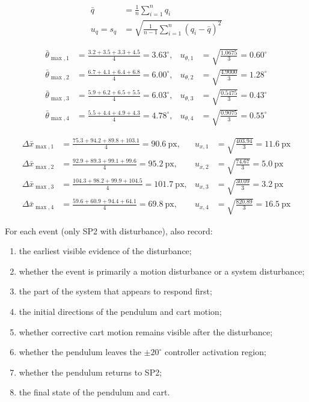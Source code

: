 \documentclass[11pt,a4paper]{article}
\begin{document}
\begin{align}
\bar{q} &= \frac{1}{n}\sum_{i=1}^{n} q_i \label{eq:mean} \\
u_q = s_q &= \sqrt{\frac{1}{n-1}\sum_{i=1}^{n}\left(q_i-\bar{q}\right)^2} \label{eq:std}
\end{align}

\begin{align*}
\bar{\theta}_{\max,1} &= \frac{3.2+3.5+3.3+4.5}{4} = 3.63^\circ, &
u_{\theta,1} &= \sqrt{\frac{1.0675}{3}} = 0.60^\circ \\
\bar{\theta}_{\max,2} &= \frac{6.7+4.1+6.4+6.8}{4} = 6.00^\circ, &
u_{\theta,2} &= \sqrt{\frac{4.9000}{3}} = 1.28^\circ \\
\bar{\theta}_{\max,3} &= \frac{5.9+6.2+6.5+5.5}{4} = 6.03^\circ, &
u_{\theta,3} &= \sqrt{\frac{0.5475}{3}} = 0.43^\circ \\
\bar{\theta}_{\max,4} &= \frac{5.5+4.4+4.9+4.3}{4} = 4.78^\circ, &
u_{\theta,4} &= \sqrt{\frac{0.9075}{3}} = 0.55^\circ
\end{align*}

\begin{align*}
\Delta\bar{x}_{\max,1} &= \frac{75.3+94.2+89.8+103.1}{4} = 90.6~\text{px}, &
u_{x,1} &= \sqrt{\frac{403.94}{3}} = 11.6~\text{px} \\
\Delta\bar{x}_{\max,2} &= \frac{92.9+89.3+99.1+99.6}{4} = 95.2~\text{px}, &
u_{x,2} &= \sqrt{\frac{74.67}{3}} = 5.0~\text{px} \\
\Delta\bar{x}_{\max,3} &= \frac{104.3+98.2+99.9+104.5}{4} = 101.7~\text{px}, &
u_{x,3} &= \sqrt{\frac{30.09}{3}} = 3.2~\text{px} \\
\Delta\bar{x}_{\max,4} &= \frac{59.6+60.9+94.4+64.1}{4} = 69.8~\text{px}, &
u_{x,4} &= \sqrt{\frac{820.89}{3}} = 16.5~\text{px}
\end{align*}

For each event (only SP2 with disturbance), also record:
\begin{enumerate}
    \item the earliest visible evidence of the disturbance;
    \item whether the event is primarily a motion disturbance or a system disturbance;
    \item the part of the system that appears to respond first;
    \item the initial directions of the pendulum and cart motion;
    \item whether corrective cart motion remains visible after the disturbance;
    \item whether the pendulum leaves the $\pm 20^\circ$ controller activation region;
    \item whether the pendulum returns to SP2;
    \item the final state of the pendulum and cart.
\end{enumerate}
\end{document}
